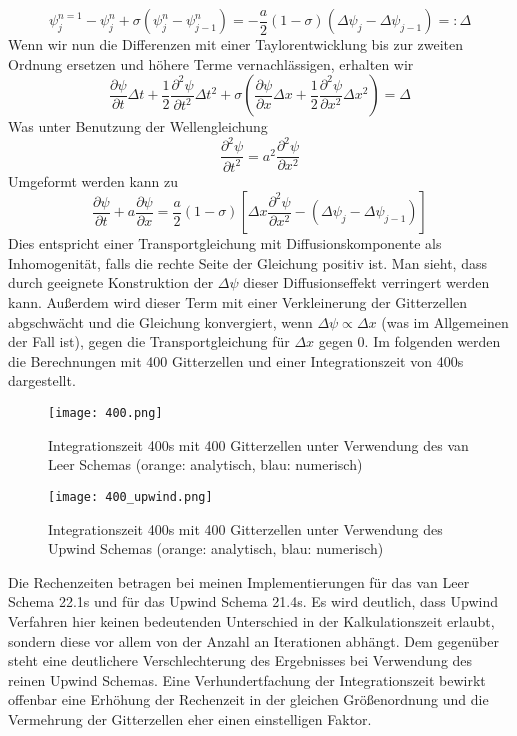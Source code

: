 \documentclass[12pt]{article}
\begin{document}
$$\psi^{n=1}_j-\psi^n_j+\sigma(\psi^n_j-\psi^n_{j-1})=-\frac{a}{2}(1-\sigma)(\Delta\psi_j-\Delta\psi_{j-1})=:\Delta$$
Wenn wir nun die Differenzen mit einer Taylorentwicklung bis zur zweiten Ordnung ersetzen und höhere Terme vernachlässigen, erhalten wir
$$\frac{\partial\psi}{\partial{t}}\Delta{t}+\frac{1}{2}\frac{\partial^2\psi}{\partial{t}^2}\Delta{t}^2+\sigma\left(\frac{\partial\psi}{\partial{x}}\Delta{x}+\frac{1}{2}\frac{\partial^2\psi}{\partial{x}^2}\Delta{x}^2\right)=\Delta$$
Was unter Benutzung der Wellengleichung 
$$\frac{\partial^2\psi}{\partial{t}^2}=a^2\frac{\partial^2\psi}{\partial{x}^2}$$
Umgeformt werden kann zu 
$$\frac{\partial\psi}{\partial{t}}+a\frac{\partial\psi}{\partial{x}}=\frac{a}{2}(1-\sigma)\left[\Delta{x}\frac{\partial^2\psi}{\partial{x}^2}-(\Delta\psi_j-\Delta\psi_{j-1})\right]$$
Dies entspricht einer Transportgleichung mit Diffusionskomponente als Inhomogenität, falls die rechte Seite der Gleichung positiv ist. Man sieht, dass durch geeignete Konstruktion der $\Delta\psi$ dieser Diffusionseffekt verringert werden kann. Außerdem wird dieser Term mit einer Verkleinerung der Gitterzellen abgschwächt und die Gleichung konvergiert, wenn $\Delta\psi\propto\Delta{x}$ (was im Allgemeinen der Fall ist), gegen die Transportgleichung für $\Delta{x}$ gegen 0.\newline
Im folgenden werden die Berechnungen mit 400 Gitterzellen und einer Integrationszeit von 400s dargestellt.

\begin{figure}[H]\centering\texttt{[image: 400.png]}\caption{Integrationszeit 400s mit 400 Gitterzellen unter Verwendung des van Leer Schemas (orange: analytisch, blau: numerisch)}\end{figure}

\begin{figure}[H]\centering\texttt{[image: 400\_upwind.png]}\caption{Integrationszeit 400s mit 400 Gitterzellen unter Verwendung des Upwind Schemas (orange: analytisch, blau: numerisch)}\end{figure}

Die Rechenzeiten betragen bei meinen Implementierungen für das van Leer Schema 22.1s und für das Upwind Schema 21.4s. Es wird deutlich, dass Upwind Verfahren hier keinen bedeutenden Unterschied in der Kalkulationszeit erlaubt, sondern diese vor allem von der Anzahl an Iterationen abhängt. Dem gegenüber steht eine deutlichere Verschlechterung des Ergebnisses bei Verwendung des reinen Upwind Schemas. Eine Verhundertfachung der Integrationszeit bewirkt offenbar eine Erhöhung der Rechenzeit in der gleichen Größenordnung und die Vermehrung der Gitterzellen eher einen einstelligen Faktor.
\end{document}
